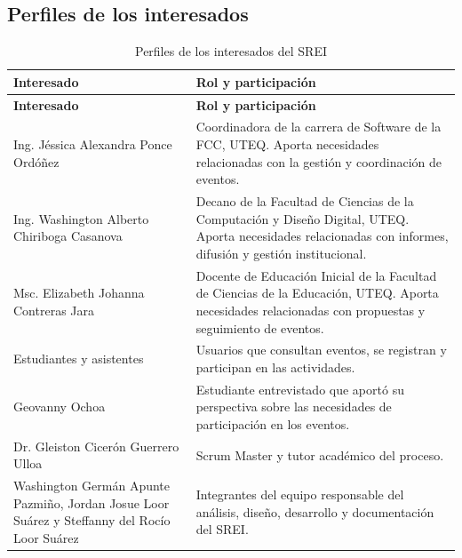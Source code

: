 \subsection{Perfiles de los interesados}
\begin{longtable}{P{0.36\textwidth} P{0.56\textwidth}}
\caption{Perfiles de los interesados del SREI}\\
\toprule
\textbf{Interesado} & \textbf{Rol y participación}\\
\midrule
\endfirsthead
\toprule
\textbf{Interesado} & \textbf{Rol y participación}\\
\midrule
\endhead
Ing. Jéssica Alexandra Ponce Ordóñez & Coordinadora de la carrera de Software de la FCC, UTEQ. Aporta necesidades relacionadas con la gestión y coordinación de eventos.\\
Ing. Washington Alberto Chiriboga Casanova & Decano de la Facultad de Ciencias de la Computación y Diseño Digital, UTEQ. Aporta necesidades relacionadas con informes, difusión y gestión institucional.\\
Msc. Elizabeth Johanna Contreras Jara & Docente de Educación Inicial de la Facultad de Ciencias de la Educación, UTEQ. Aporta necesidades relacionadas con propuestas y seguimiento de eventos.\\
Estudiantes y asistentes & Usuarios que consultan eventos, se registran y participan en las actividades.\\
Geovanny Ochoa & Estudiante entrevistado que aportó su perspectiva sobre las necesidades de participación en los eventos.\\
Dr. Gleiston Cicerón Guerrero Ulloa & Scrum Master y tutor académico del proceso.\\
Washington Germán Apunte Pazmiño, Jordan Josue Loor Suárez y Steffanny del Rocío Loor Suárez & Integrantes del equipo responsable del análisis, diseño, desarrollo y documentación del SREI.\\
\bottomrule
\end{longtable}

